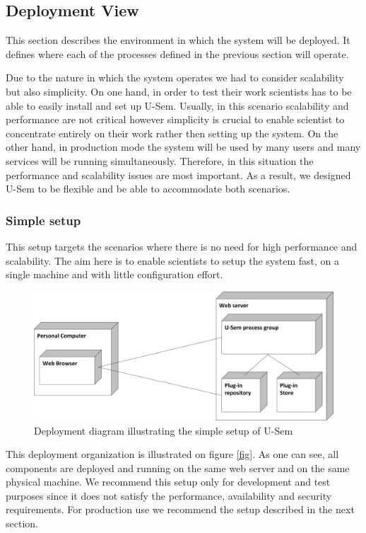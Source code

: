\subsection{Deployment View}

This section describes the environment in which the system will be deployed. It defines where each of the processes defined in the previous section will operate. 

Due to the nature in which the system operates we had to consider scalability but also simplicity. On one hand, in order to test their work scientists has to be able to easily install and set up U-Sem. Usually, in this scenario scalability and performance are not critical however simplicity is crucial to enable scientist to concentrate entirely on their work rather then setting up the system. On the other hand, in production mode the system will be used by many users and many services will be running simultaneously. Therefore, in this situation the performance and scalability issues are most important. As a result, we designed U-Sem to be flexible and be able to accommodate both scenarios.


\subsubsection{Simple setup}

This setup targets the scenarios where there is no need for high performance and scalability. The aim here is to enable scientists to setup the system fast, on a single machine and with little configuration effort. 

\begin{figure}[h!]
  \centering
  	\includegraphics[scale=0.70]{plug-in/layers/simple_setup.png}
  \caption{Deployment diagram illustrating the simple setup of U-Sem}
  \label{simple_set}
\end{figure}

This deployment organization is illustrated on figure \ref{fig}. As one can see, all components are deployed and running on the same web server and on the same physical machine. We recommend this setup only for development and test purposes since it does not satisfy the performance, availability and security requirements. For production use we recommend the setup described in the next section.

